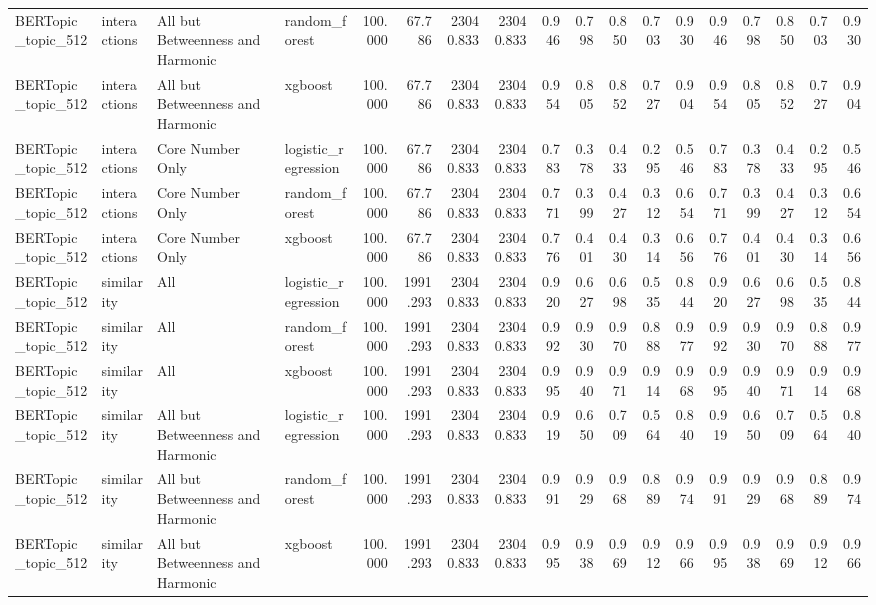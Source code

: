 \begin{tabular}{llllrrrrrrrrrrrrrr}
BERTopic\_topic\_512 & interactions & All but Betweenness and Harmonic & random\_forest & 100.000 & 67.786 & 23040.833 & 23040.833 & 0.946 & 0.798 & 0.850 & 0.703 & 0.930 & 0.946 & 0.798 & 0.850 & 0.703 & 0.930 \\
BERTopic\_topic\_512 & interactions & All but Betweenness and Harmonic & xgboost & 100.000 & 67.786 & 23040.833 & 23040.833 & 0.954 & 0.805 & 0.852 & 0.727 & 0.904 & 0.954 & 0.805 & 0.852 & 0.727 & 0.904 \\
BERTopic\_topic\_512 & interactions & Core Number Only & logistic\_regression & 100.000 & 67.786 & 23040.833 & 23040.833 & 0.783 & 0.378 & 0.433 & 0.295 & 0.546 & 0.783 & 0.378 & 0.433 & 0.295 & 0.546 \\
BERTopic\_topic\_512 & interactions & Core Number Only & random\_forest & 100.000 & 67.786 & 23040.833 & 23040.833 & 0.771 & 0.399 & 0.427 & 0.312 & 0.654 & 0.771 & 0.399 & 0.427 & 0.312 & 0.654 \\
BERTopic\_topic\_512 & interactions & Core Number Only & xgboost & 100.000 & 67.786 & 23040.833 & 23040.833 & 0.776 & 0.401 & 0.430 & 0.314 & 0.656 & 0.776 & 0.401 & 0.430 & 0.314 & 0.656 \\
BERTopic\_topic\_512 & similarity & All & logistic\_regression & 100.000 & 1991.293 & 23040.833 & 23040.833 & 0.920 & 0.627 & 0.698 & 0.535 & 0.844 & 0.920 & 0.627 & 0.698 & 0.535 & 0.844 \\
BERTopic\_topic\_512 & similarity & All & random\_forest & 100.000 & 1991.293 & 23040.833 & 23040.833 & 0.992 & 0.930 & 0.970 & 0.888 & 0.977 & 0.992 & 0.930 & 0.970 & 0.888 & 0.977 \\
BERTopic\_topic\_512 & similarity & All & xgboost & 100.000 & 1991.293 & 23040.833 & 23040.833 & 0.995 & 0.940 & 0.971 & 0.914 & 0.968 & 0.995 & 0.940 & 0.971 & 0.914 & 0.968 \\
BERTopic\_topic\_512 & similarity & All but Betweenness and Harmonic & logistic\_regression & 100.000 & 1991.293 & 23040.833 & 23040.833 & 0.919 & 0.650 & 0.709 & 0.564 & 0.840 & 0.919 & 0.650 & 0.709 & 0.564 & 0.840 \\
BERTopic\_topic\_512 & similarity & All but Betweenness and Harmonic & random\_forest & 100.000 & 1991.293 & 23040.833 & 23040.833 & 0.991 & 0.929 & 0.968 & 0.889 & 0.974 & 0.991 & 0.929 & 0.968 & 0.889 & 0.974 \\
BERTopic\_topic\_512 & similarity & All but Betweenness and Harmonic & xgboost & 100.000 & 1991.293 & 23040.833 & 23040.833 & 0.995 & 0.938 & 0.969 & 0.912 & 0.966 & 0.995 & 0.938 & 0.969 & 0.912 & 0.966 \\

\end{tabular}
